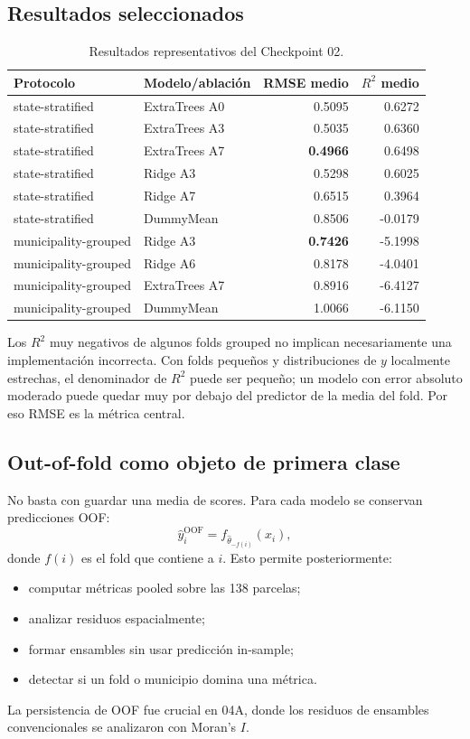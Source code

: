 \subsection{Resultados seleccionados}

\begin{table}[H]
\centering
\caption{Resultados representativos del Checkpoint 02.}
\label{tab:cp02-baselines}
\small
\begin{tabular}{llrr}
\toprule
Protocolo & Modelo/ablación & RMSE medio & $R^2$ medio \\
\midrule
state-stratified & ExtraTrees A0 & 0.5095 & 0.6272 \\
state-stratified & ExtraTrees A3 & 0.5035 & 0.6360 \\
state-stratified & ExtraTrees A7 & \textbf{0.4966} & 0.6498 \\
state-stratified & Ridge A3 & 0.5298 & 0.6025 \\
state-stratified & Ridge A7 & 0.6515 & 0.3964 \\
state-stratified & DummyMean & 0.8506 & -0.0179 \\
\midrule
municipality-grouped & Ridge A3 & \textbf{0.7426} & -5.1998 \\
municipality-grouped & Ridge A6 & 0.8178 & -4.0401 \\
municipality-grouped & ExtraTrees A7 & 0.8916 & -6.4127 \\
municipality-grouped & DummyMean & 1.0066 & -6.1150 \\
\bottomrule
\end{tabular}
\end{table}

Los $R^2$ muy negativos de algunos folds grouped no implican necesariamente una implementación
incorrecta. Con folds pequeños y distribuciones de $y$ localmente estrechas, el denominador
de $R^2$ puede ser pequeño; un modelo con error absoluto moderado puede quedar muy por debajo
del predictor de la media del fold. Por eso RMSE es la métrica central.

\subsection{Out-of-fold como objeto de primera clase}

No basta con guardar una media de scores. Para cada modelo se conservan predicciones OOF:
\[
\widehat y_i^{\mathrm{OOF}}
=
f_{\widehat\theta_{-f(i)}}(x_i),
\]
donde $f(i)$ es el fold que contiene a $i$. Esto permite posteriormente:
\begin{itemize}
\item computar métricas pooled sobre las 138 parcelas;
\item analizar residuos espacialmente;
\item formar ensambles sin usar predicción in-sample;
\item detectar si un fold o municipio domina una métrica.
\end{itemize}
La persistencia de OOF fue crucial en 04A, donde los residuos de ensambles convencionales se
analizaron con Moran's $I$.

